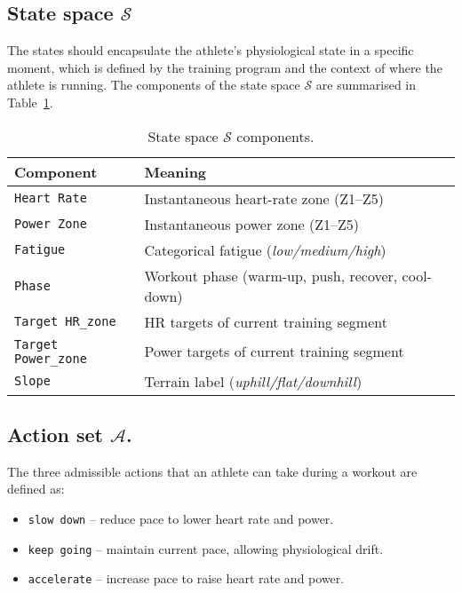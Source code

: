\subsection{State space \(\mathcal{S}\)}\label{subsec:state_space}
The states should encapsulate the athlete's physiological state in a specific moment, which is defined by the training program and the context of where the athlete is running. The components of the state space \(\mathcal{S}\) are summarised in Table~\ref{tab:state_space}.
\begin{table}[H]
\centering
\begin{tabular}{@{}lll@{}}
\toprule
\textbf{Component}        & \textbf{Meaning}                                        \\ \midrule
\verb|Heart Rate|         & Instantaneous heart-rate zone (Z1–Z5)                   \\
\verb|Power Zone|         & Instantaneous power zone (Z1–Z5)                        \\
\verb|Fatigue|            & Categorical fatigue (\emph{low/medium/high})            \\
\verb|Phase|              & Workout phase (warm-up, push, recover, cool-down)       \\
\verb|Target HR_zone|     & HR targets of current training segment                           \\ 
\verb|Target Power_zone|  & Power targets of current training segment                        \\
\verb|Slope|              & Terrain label (\emph{uphill/flat/downhill})             \\ \bottomrule
\end{tabular}

\caption{State space \(\mathcal{S}\) components.}

\label{tab:state_space}
\end{table}

\subsection{Action set \(\mathcal{A}\).}
The three admissible actions that an athlete can take during a workout are defined as:
\begin{itemize}
  \item \texttt{slow down} – reduce pace to lower heart rate and power.
  \item \texttt{keep going} – maintain current pace, allowing physiological drift.
  \item \texttt{accelerate} – increase pace to raise heart rate and power.
\end{itemize}


